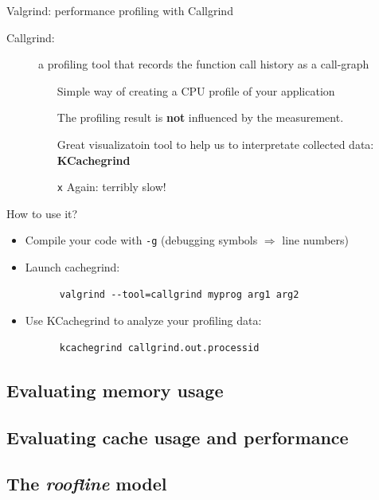 \documentclass[10pt,xcolor=table]{beamer}
\begin{document}
\begin{frame}[fragile]{Valgrind: performance profiling with Callgrind}
  \begin{description}
  \item[Callgrind:] a profiling tool that records the function call history as a call-graph
    \begin{itemize}
    \item[\checkmark] Simple way of creating a CPU profile of your
      application
    \item[{\checkmark}] The profiling result is {\bf not} influenced by the
      measurement.
    \item[\checkmark] Great visualizatoin tool to help us to
      interpretate collected data: {\bf KCachegrind}
    \item[{\tt x}] Again: terribly slow!
    \end{itemize}
  \end{description}

  \pause

  How to use it?
  \begin{itemize}
  \item Compile your code with {\tt -g} (debugging symbols
    $\Rightarrow$ line numbers)
  \item Launch cachegrind:
    \begin{lstlisting}
      valgrind --tool=callgrind myprog arg1 arg2
    \end{lstlisting}
  \item Use KCachegrind to analyze your profiling data:
    \begin{lstlisting}
      kcachegrind callgrind.out.processid
    \end{lstlisting}
  \end{itemize}
\end{frame}

\subsection{Evaluating memory usage}

\frame{
}

\subsection{Evaluating cache usage and performance}

\frame{
}


\subsection{The \emph{roofline} model}
\end{document}
